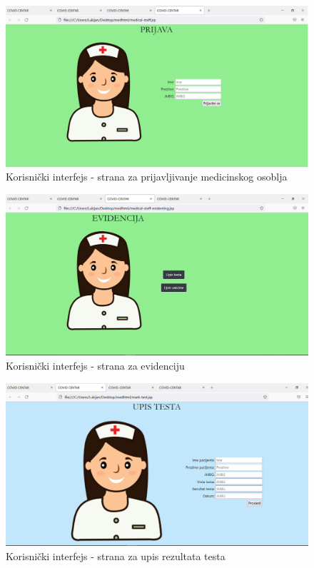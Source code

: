 \documentclass[titlepage]{article}
\begin{document}
\begin{figure}[H]
\centering
\includegraphics[scale=0.43]{prijava}
\caption{Korisni\v{c}ki interfejs - strana za prijavljivanje medicinskog osoblja}
\label{slk:komponente}
\end{figure}

\begin{figure}[H]
\centering
\includegraphics[scale=0.43]{evidencija}
\caption{Korisni\v{c}ki interfejs - strana za evidenciju}
\label{slk:komponente}
\end{figure}

\begin{figure}[H]
\centering
\includegraphics[scale=0.43]{upistesta}
\caption{Korisni\v{c}ki interfejs - strana za upis rezultata testa}
\label{slk:komponente}
\end{figure}
\end{document}
